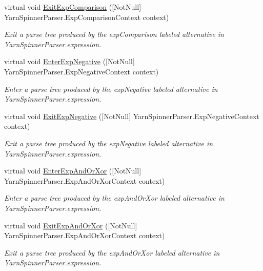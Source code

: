 \begin{DoxyCompactItemize}
virtual void \hyperlink{a00196_af8f026d529dcea66d5ac519ce404ed55}{Exit\-Exp\-Comparison} (\mbox{[}Not\-Null\mbox{]} Yarn\-Spinner\-Parser.\-Exp\-Comparison\-Context context)
\begin{DoxyCompactList}\small\item\em Exit a parse tree produced by the {\ttfamily exp\-Comparison} labeled alternative in Yarn\-Spinner\-Parser.\-expression. \end{DoxyCompactList}\item 
virtual void \hyperlink{a00196_a85e82341fb00749dcc443062ce7e6cd4}{Enter\-Exp\-Negative} (\mbox{[}Not\-Null\mbox{]} Yarn\-Spinner\-Parser.\-Exp\-Negative\-Context context)
\begin{DoxyCompactList}\small\item\em Enter a parse tree produced by the {\ttfamily exp\-Negative} labeled alternative in Yarn\-Spinner\-Parser.\-expression. \end{DoxyCompactList}\item 
virtual void \hyperlink{a00196_accebff941879b7b98517ee172bc88c51}{Exit\-Exp\-Negative} (\mbox{[}Not\-Null\mbox{]} Yarn\-Spinner\-Parser.\-Exp\-Negative\-Context context)
\begin{DoxyCompactList}\small\item\em Exit a parse tree produced by the {\ttfamily exp\-Negative} labeled alternative in Yarn\-Spinner\-Parser.\-expression. \end{DoxyCompactList}\item 
virtual void \hyperlink{a00196_abe7e39550dec3976ad45afbd5a00984a}{Enter\-Exp\-And\-Or\-Xor} (\mbox{[}Not\-Null\mbox{]} Yarn\-Spinner\-Parser.\-Exp\-And\-Or\-Xor\-Context context)
\begin{DoxyCompactList}\small\item\em Enter a parse tree produced by the {\ttfamily exp\-And\-Or\-Xor} labeled alternative in Yarn\-Spinner\-Parser.\-expression. \end{DoxyCompactList}\item 
virtual void \hyperlink{a00196_a126a1a450281df186411ba708a4f8edb}{Exit\-Exp\-And\-Or\-Xor} (\mbox{[}Not\-Null\mbox{]} Yarn\-Spinner\-Parser.\-Exp\-And\-Or\-Xor\-Context context)
\begin{DoxyCompactList}\small\item\em Exit a parse tree produced by the {\ttfamily exp\-And\-Or\-Xor} labeled alternative in Yarn\-Spinner\-Parser.\-expression. \end{DoxyCompactList}\item 

\end{DoxyCompactItemize}

